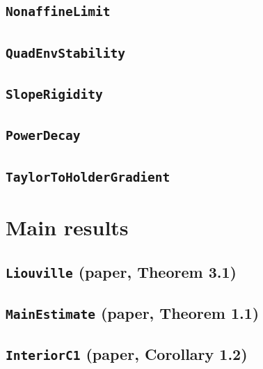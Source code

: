 \documentclass[11pt]{amsart}
\theoremstyle{definition}
\begin{document}
\subsection{\texorpdfstring{\texttt{NonaffineLimit}}{NonaffineLimit}}\label{node:NonaffineLimit}


\subsection{\texorpdfstring{\texttt{QuadEnvStability}}{QuadEnvStability}}\label{node:QuadEnvStability}


\subsection{\texorpdfstring{\texttt{SlopeRigidity}}{SlopeRigidity}}\label{node:SlopeRigidity}


\subsection{\texorpdfstring{\texttt{PowerDecay}}{PowerDecay}}\label{node:PowerDecay}


\subsection{\texorpdfstring{\texttt{TaylorToHolderGradient}}{TaylorToHolderGradient}}\label{node:TaylorToHolderGradient}


\section{Main results}\label{sec:main}
\subsection{\texorpdfstring{\texttt{Liouville} (paper, Theorem 3.1)}{Liouville}}\label{node:Liouville}


\subsection{\texorpdfstring{\texttt{MainEstimate} (paper, Theorem 1.1)}{MainEstimate}}\label{node:MainEstimate}


\subsection{\texorpdfstring{\texttt{InteriorC1} (paper, Corollary 1.2)}{InteriorC1}}\label{node:InteriorC1}

\end{document}
